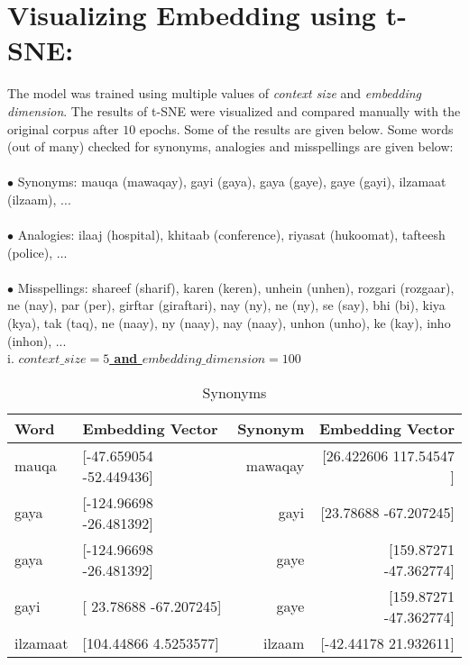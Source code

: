 \documentclass{exam}
\begin{document}
\section*{Visualizing Embedding using t-SNE:}
The model was trained using multiple values of \textit{context size} and \textit{embedding dimension}. The results of t-SNE were visualized and compared manually with the original corpus after $10$ epochs. Some of the results are given below. Some words (out of many) checked for synonyms, analogies and misspellings are given below:\\ \\
$\bullet$ Synonyms: mauqa (mawaqay), gayi (gaya), gaya (gaye), gaye (gayi), ilzamaat (ilzaam), ...\\ \\
$\bullet$ Analogies: ilaaj (hospital), khitaab (conference), riyasat (hukoomat), tafteesh (police), ...\\ \\
$\bullet$ Misspellings: shareef (sharif), karen (keren), unhein (unhen), rozgari (rozgaar), ne (nay), par (per), girftar (giraftari), nay (ny), ne (ny), se (say), bhi (bi), kiya (kya), tak (taq), ne (naay), ny (naay), nay (naay), unhon (unho), ke (kay), inho (inhon), ...\\

i. \underline{\textbf{$context\_size = 5$ and $embedding\_dimension = 100$}}\\

\begin{table}[h!]
  			\begin{center}
    			\caption{Synonyms}
    			\begin{tabular}{l|l|r|r}
      				\textbf{Word} & \textbf{Embedding Vector} & \textbf{Synonym} & \textbf{Embedding Vector}\\
      				\hline
      				mauqa & [-47.659054 -52.449436]
 & mawaqay & [26.422606 117.54547 ]\\
      				gaya & [-124.96698   -26.481392] & gayi & [23.78688  -67.207245]\\
      				gaya & [-124.96698   -26.481392] & gaye & [159.87271  -47.362774]\\
      				gayi & [ 23.78688  -67.207245] & gaye & [159.87271  -47.362774]\\
      				ilzamaat & [104.44866 4.5253577] & ilzaam & [-42.44178   21.932611]\\
    			\end{tabular}
  			\end{center}
\end{table}
\end{document}

